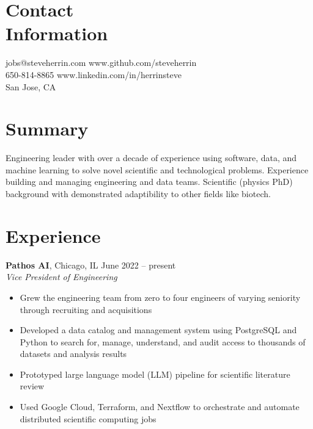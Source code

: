 \documentclass[margin,line]{resume}
\begin{document}
\begin{resume}

    \section{\mysidestyle Contact\\Information}

    jobs@steveherrin.com		\hfill www.github.com/steveherrin		\vspace{0mm}\\\vspace{0mm}%
    650-814-8865				\hfill www.linkedin.com/in/herrinsteve		\vspace{0mm}\\\vspace{-4.5mm}%
    San Jose, CA    				\hfill		\vspace{0mm}\\\vspace{0mm}%

    \section{\mysidestyle Summary}
    Engineering leader with over a decade of experience using software, data, and machine learning to solve novel scientific and technological problems. Experience building and managing engineering and data teams. Scientific (physics PhD) background with demonstrated adaptibility to other fields like biotech.%
    \section{\mysidestyle Experience}
    \textbf{Pathos AI}, Chicago, IL \hfill\vspace{1mm}\hfill June 2022 -- present\\%
    \textsl{Vice President of Engineering}
    \begin{itemize}
    \item Grew the engineering team from zero to four engineers of varying seniority through recruiting and acquisitions
    \item Developed a data catalog and management system using PostgreSQL and Python to search for, manage, understand, and audit access to thousands of datasets and analysis results
    \item Prototyped large language model (LLM) pipeline for scientific literature review
    \item Used Google Cloud, Terraform, and Nextflow to orchestrate and automate distributed scientific computing jobs
    \end{itemize}


\end{resume}
\end{document}
